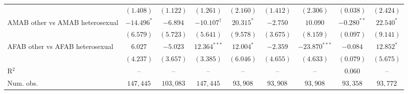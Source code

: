 \begin{table}[htpb!]
{\begin{tabular}{l c c c c c c c c}
 & $(1.408)$ & $(1.122)$ & $(1.261)$ & $(2.160)$ & $(1.412)$ & $(2.306)$ & $(0.038)$ & $(2.424)$ \\
AMAB other vs AMAB heterosexual & $-14.496^{*}$ & $-6.894$ & $-10.107^{\dagger}$ & $20.315^{*}$ & $-2.750$ & $10.090$ & $-0.280^{**}$ & $22.540^{*}$ \\
 & $(6.579)$ & $(5.723)$ & $(5.641)$ & $(9.578)$ & $(3.675)$ & $(8.159)$ & $(0.097)$ & $(9.141)$ \\
AFAB other vs AFAB heterosexual & $6.027$ & $-5.023$ & $12.364^{***}$ & $12.004^{*}$ & $-2.359$ & $-23.870^{***}$ & $-0.084$ & $12.852^{*}$ \\
 & $(4.237)$ & $(3.657)$ & $(3.385)$ & $(6.046)$ & $(4.655)$ & $(4.633)$ & $(0.079)$ & $(5.675)$ \\
\hline
R$^2$ & -- & -- & -- & -- & -- & -- & $0.060$ & -- \\
Num. obs. & $147,445$ & $103,083$ & $147,445$ & $93,908$ & $93,908$ & $93,908$ & $93,358$ & $93,772$ \\
\hline
\end{tabular}%
}
\par\vspace{1ex}
\begin{minipage}{\textwidth}\footnotesize\raggedright

\end{minipage}
\end{table}
